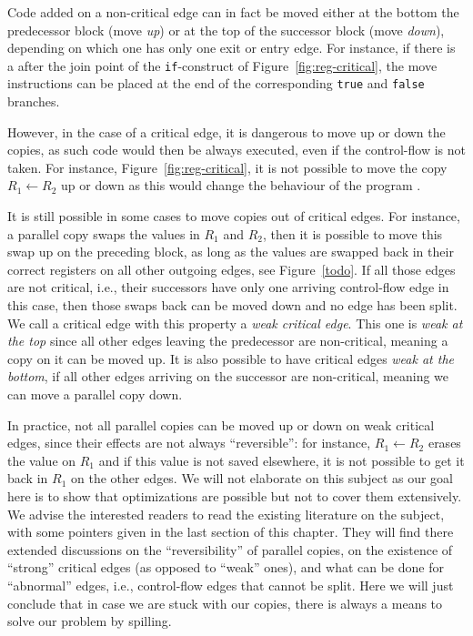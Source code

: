 {Code added on a non-critical edge can in fact be moved either at the bottom the predecessor block (move \emph{up}) or at the top of the successor block (move \emph{down}), depending on which one has only one exit or entry edge.
For instance, if there is a \phifun after the join point of the \texttt{if}-construct of Figure~\ref{fig:reg-critical}, the move instructions can be placed at the end of the corresponding \texttt{true} and \texttt{false} branches.

However, in the case of a critical edge, it is dangerous to move up or down the copies, as such code would then be always executed, even if the control-flow is not taken.
For instance, Figure~\ref{fig:reg-critical}, it is not possible to move the copy $R_1 \gets R_2$ up or down as this would change the behaviour of the program .

It is still possible in some cases to move copies out of critical edges.
For instance, a parallel copy swaps the values in $R_1$ and $R_2$, then it is possible to move this swap up on the preceding block, as long as the values are swapped back in their correct registers on all other outgoing edges, see Figure~\ref{todo}.
If all those edges are not critical, i.e., their successors have only one arriving control-flow edge in this case, then those swaps back can be moved down and no edge has been split.
We call a critical edge with this property a \emph{weak critical edge}.
This one is \emph{weak at the top} since all other edges leaving the predecessor are non-critical, meaning a copy on it can be moved up.
It is also possible to have critical edges \emph{weak at the bottom}, if all other edges arriving on the successor are non-critical, meaning we can move a parallel copy down.

In practice, not all parallel copies can be moved up or down on weak critical edges, since their effects are not always ``reversible'':
for instance, $R_1 \gets R_2$ erases the value on $R_1$ and if this value is not saved elsewhere, it is not possible to get it back in $R_1$ on the other edges.
We will not elaborate on this subject as our goal here is to show that optimizations are possible but not to cover them extensively.
We advise the interested readers to read the existing literature on the subject, with some pointers given in the last section of this chapter.
They will find there extended discussions on the ``reversibility'' of parallel copies, on the existence of ``strong'' critical edges (as opposed to ``weak'' ones), and what can be done for ``abnormal'' edges, i.e., control-flow edges that cannot be split.
Here we will just conclude that in case we are stuck with our copies, there is always a means to solve our problem by spilling.



}
